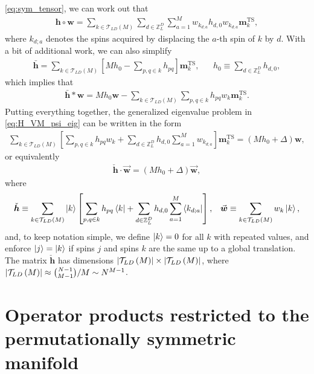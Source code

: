 \documentclass[nofootinbib,notitlepage,11pt]{revtex4-2}
\renewcommand{\t}{\text} %
\newcommand{\p}[1]{\left(#1\right)} %
\renewcommand{\sp}[1]{\left[#1\right]} %
\renewcommand{\c}{\cdot} %
\newcommand{\m}{\bm} %
\renewcommand{\v}{\vec} %
\newcommand{\1}{\mathds{1}}
\newcommand{\T}{\mathcal{T}}
\newcommand{\ZZ}{\mathbb{Z}}
\begin{document}
\eqref{eq:sym_tensor}, we can work out that
\begin{align}
  \m h\circ\m w
  = \sum_{k\in\T_{LD}\p{M}} \sum_{d\in\ZZ_L^D} \sum_{a=1}^M w_{k_{d;a}}
  h_{d,0} w_{k_{d;a}} \m m_k^{\t{TS}},
\end{align}
where $k_{d;a}$ denotes the spins acquired by displacing the $a$-th
spin of $k$ by $d$.  With a bit of additional work, we can also
simplify
\begin{align}
  \bar{\m h}
  = \sum_{k\in\T_{LD}\p{M}} \sp{M h_0 - \sum_{p,q\in k} h_{pq}}
  \m m_k^{\t{TS}},
  &&
  h_0 \equiv \sum_{d\in\ZZ_L^D} h_{d,0},
\end{align}
which implies that
\begin{align}
  \bar{\m h} * \m w = M h_0 \m w
  - \sum_{k\in\T_{LD}\p{M}} \sum_{p,q\in k} h_{pq} w_k \m m_k^{\t{TS}}.
\end{align}
Putting everything together, the generalized eigenvalue problem in
\eqref{eq:H_VM_psi_eig} can be written in the form
\begin{align}
  \sum_{k\in\T_{LD}\p{M}} \sp{\sum_{p,q\in k} h_{pq} w_k
    + \sum_{d\in\ZZ_L^D} h_{d,0} \sum_{a=1}^M w_{k_{d;a}}}
  \m m_k^{\t{TS}}
  = \p{M h_0 + \Delta} \m w,
\end{align}
or equivalently
\begin{align}
  \check{\m h} \c \v{\m w} = \p{M h_0 + \Delta} \v{\m w},
  \label{eq:H_VM_eig_simp}
\end{align}
where
\begin{align}
  \check{\m h} \equiv
  \sum_{k\in\T_{LD}\p{M}} \ket{k}
  \sp{\sum_{p,q\in k} h_{pq} \bra{k}
    + \sum_{d\in\ZZ_L^D} h_{d,0} \sum_{a=1}^M \bra{k_{d;a}}},
  &&
  \v{\m w} \equiv \sum_{k\in\T_{LD}\p{M}} w_k \ket{k},
\end{align}
and, to keep notation simple, we define $\ket{k}=0$ for all $k$ with
repeated values, and enforce $\ket{j}=\ket{k}$ if spins $j$ and spins
$k$ are the same up to a global translation.  The matrix
$\check{\m h}$ has dimensions
$\abs{\T_{LD}\p{M}}\times\abs{\T_{LD}\p{M}}$, where
$\abs{\T_{LD}\p{M}} \approx { N-1 \choose M-1 }/M \sim N^{M-1}$.

\section{Operator products restricted to the permutationally symmetric
  manifold}
\label{sec:sym_prod}
\end{document}
